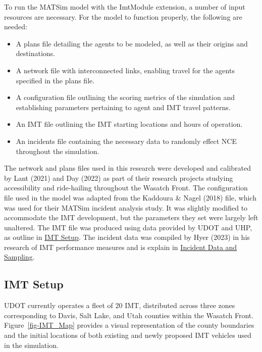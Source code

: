 \documentclass[fancy, oneside, mastersfancy, ms]{byuthesis}
\providecommand{\tightlist}{%
  \setlength{\itemsep}{0pt}\setlength{\parskip}{0pt}}\usepackage{longtable,booktabs,array}
\begin{document}
To run the MATSim model with the ImtModule extension, a number of input
resources are necessary. For the model to function properly, the
following are needed:

\begin{itemize}
\tightlist
\item
  A plans file detailing the agents to be modeled, as well as their
  origins and destinations.
\item
  A network file with interconnected links, enabling travel for the
  agents specified in the plans file.
\item
  A configuration file outlining the scoring metrics of the simulation
  and establishing parameters pertaining to agent and IMT travel
  patterns.
\item
  An IMT file outlining the IMT starting locations and hours of
  operation.
\item
  An incidents file containing the necessary data to randomly effect NCE
  throughout the simulation.
\end{itemize}

The network and plans files used in this research were developed and
calibrated by Lant (2021) and Day (2022) as part of their research
projects studying accessibility and ride-hailing throughout the Wasatch
Front. The configuration file used in the model was adapted from the
Kaddoura \& Nagel (2018) file, which was used for their MATSim incident
analysis study. It was slightly modified to accommodate the IMT
development, but the parameters they set were largely left unaltered.
The IMT file was produced using data provided by UDOT and UHP, as
outline in \protect\hyperlink{sec-MATSim_mod}{IMT Setup}. The incident
data was compiled by Hyer (2023) in his research of IMT performance
measures and is explain in \protect\hyperlink{sec-inc_data}{Incident
Data and Sampling}.

\hypertarget{sec-IMT_setup}{%
\subsection{IMT Setup}\label{sec-IMT_setup}}

UDOT currently operates a fleet of 20 IMT, distributed across three
zones corresponding to Davis, Salt Lake, and Utah counties within the
Wasatch Front. Figure~\ref{fig-IMT_Map} provides a visual representation
of the county boundaries and the initial locations of both existing and
newly proposed IMT vehicles used in the simulation.
\end{document}
